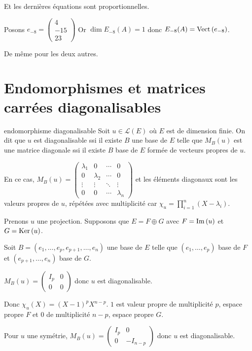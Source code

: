 \begin{exemple}
    Et les dernières équations sont proportionnelles. 

    Posons $e_{-8} = \begin{pmatrix}
        4 \\ 
        -15 \\
        23
    \end{pmatrix}$ Or $\dim E_{-8}(A) = 1$ donc $E_{-8}(A) = \operatorname{Vect} \,(e_{-8})$.

    De même pour les deux autres. 
\end{exemple}

\section{Endomorphismes et matrices carrées diagonalisables}

\begin{definition}{endomorphisme diagonalisable}{}
    Soit $u \in \mathscr L(E)$ où $E$ est de dimension finie. On dit que $u$ est diagonalisable ssi il existe 
    $B$ une base de $E$ telle que $M_B(u)$ est une matrice diagonale ssi il existe 
    $B$ base de $E$ formée de vecteurs propres de $u$.

    En ce cas, $M_B(u) = \begin{pmatrix}
        \lambda_1 & 0 & \cdots & 0 \\
        0 & \lambda_2 & \cdots & 0 \\
        \vdots & \vdots & \ddots & \vdots \\
        0 & 0 & \cdots & \lambda_n
    \end{pmatrix}$ et les éléments diagonaux sont les valeurs propres de $u$, répétées avec multiplicité car 
    $\displaystyle \chi_u = \prod_{i = 1 }^{ n } (X - \lambda_i)$.
\end{definition}

\begin{exemple}
    Prenons $u$ une projection. Supposons que $E = F \oplus G$ avec $F = \operatorname{Im} \,(u)$ et $G = \operatorname{Ker} \,(u)$.

    Soit $B = (e_1, \dots, e_p, e_{p + 1}, \dots, e_n)$ une base de $E$ telle que 
    $(e_1, \dots, e_p)$ base de $F$ et $(e_{p + 1}, \dots, e_n)$ base de $G$.

    $M_B(u) = \begin{pmatrix}
        I_p & 0 \\
        0 & 0
    \end{pmatrix}$ donc $u$ est diagonalisable.

    Donc $\chi_u(X) = (X - 1)^p X^{n - p}$. $1$ est valeur propre de multiplicité $p$, espace propre 
    $F$ et $0$ de multiplicité $n - p$, espace propre $G$.

    \lvspace Pour $u$ une symétrie, $M_B(u) = \begin{pmatrix}
        I_p & 0 \\
        0 & -I_{n - p}
    \end{pmatrix}$ donc $u$ est diagonalisable.
\end{exemple}

